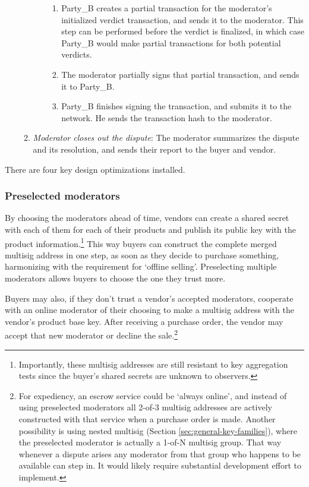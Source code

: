 \begin{enumerate}
\begin{enumerate}
\begin{enumerate}
\begin{enumerate}
                \item Party\_B creates a partial transaction for the moderator's initialized verdict transaction, and sends it to the moderator. This step can be performed before the verdict is finalized, in which case Party\_B would make partial transactions for both potential verdicts.
                \item The moderator partially signs that partial transaction, and sends it to Party\_B.
                \item Party\_B finishes signing the transaction, and submits it to the network. He sends the transaction hash to the moderator.
            \end{enumerate}{}
        \end{enumerate}{}
        \item {\em Moderator closes out the dispute}: The moderator summarizes the dispute and its resolution, and sends their report to the buyer and vendor.
    \end{enumerate}{}
\end{enumerate}{}

There are four key design optimizations installed.

\subsubsection*{Preselected moderators}

By choosing the moderators ahead of time, vendors can create a shared secret with each of them for each of their products and publish its public key with the product information.\footnote{Importantly, these multisig addresses are still resistant to key aggregation tests since the buyer's shared secrets are unknown to observers.} This way buyers can construct the complete merged multisig address in one step, as soon as they decide to purchase something, harmonizing with the requirement for `offline selling'. Preselecting multiple moderators allows buyers to choose the one they trust more.

Buyers may also, if they don't trust a vendor's accepted moderators, cooperate with an online moderator of their choosing to make a multisig address with the vendor's product base key. After receiving a purchase order, the vendor may accept that new moderator or decline the sale.\footnote{For expediency, an escrow service could be `always online', and instead of using preselected moderators all 2-of-3 multisig addresses are actively constructed with that service when a purchase order is made. Another possibility is using nested multisig (Section \ref{sec:general-key-families}), where the preselected moderator is actually a 1-of-N multisig group. That way whenever a dispute arises any moderator from that group who happens to be available can step in. It would likely require substantial development effort to implement.}

